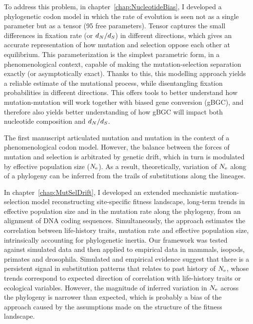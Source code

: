 To address this problem, in chapter~\ref{chap:NucleotideBias}, I developed a phylogenetic codon model in which the rate of evolution is seen not as a single parameter but as a tensor (95 free parameters).
Tensor captures the small differences in fixation rate (or $d_N / d_S$) in different directions, which gives an accurate representation of how mutation and selection oppose each other at equilibrium.
This parameterization is the simplest parametric form, in a phenomenological context, capable of making the mutation-selection separation exactly (or asymptotically exact).
Thanks to this, this modelling approach yields a reliable estimate of the mutational process, while disentangling fixation probabilities in different directions.
This offers tools to better understand how mutation-mutation will work together with biased gene conversion (gBGC), and therefore also yields better understanding of how gBGC will impact both nucleotide composition and $d_N / d_S$.

The first manuscript articulated mutation and mutation in the context of a phenomenological codon model.
However, the balance between the forces of mutation and selection is arbitrated by genetic drift, which in turn is modulated by effective population size ($N_{\textrm{e}}$).
As a result, theoretically, variation of $N_{\textrm{e}}$ along of a phylogeny can be inferred from the trails of substitutions along the lineages.

In chapter~\ref{chap:MutSelDrift}, I developed an extended mechanistic mutation-selection model reconstructing site-specific fitness landscape, long-term trends in effective population size and in the mutation rate along the phylogeny, from an alignment of DNA coding sequences.
Simultaneously, the approach estimates the correlation between life-history traits, mutation rate and effective population size, intrinsically accounting for phylogenetic inertia.
Our framework was tested against simulated data and then applied to empirical data in mammals, isopods, primates and drosophila.
Simulated and empirical evidence suggest that there is a persistent signal in substitution patterns that relates to past history of $N_{\textrm{e}}$, whose trends correspond to expected direction of correlation with life-history traits or ecological variables.
However, the magnitude of inferred variation in $N_{\textrm{e}}$ across the phylogeny is narrower than expected, which is probably a bias of the approach caused by the assumptions made on the structure of the fitness landscape.

